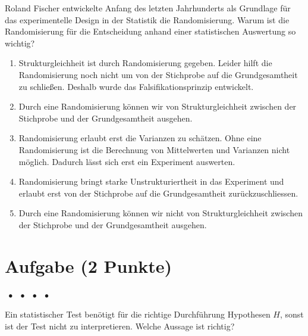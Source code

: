 \documentclass[a4paper, 9pt]{scrartcl}\usepackage[]{graphicx}\usepackage[]{xcolor}
\begin{document}
Roland Fischer entwickelte Anfang des letzten Jahrhunderts als Grundlage für das experimentelle Design in der Statistik die Randomisierung. Warum ist die Randomisierung für die Entscheidung anhand einer statistischen Auswertung so wichtig?



\begin{enumerate}
\item [\textbf{A} \msquare] Strukturgleichheit ist durch Randomisierung gegeben. Leider hilft die Randomisierung noch nicht um von der Stichprobe auf die Grundgesamtheit zu schließen. Deshalb wurde das Falsifikationsprinzip entwickelt.
\item [\textbf{B} \msquare] Durch eine Randomisierung können wir von Strukturgleichheit zwischen der Stichprobe und der Grundgesamtheit ausgehen.
\item [\textbf{C} \msquare] Randomisierung erlaubt erst die Varianzen zu schätzen. Ohne eine Randomisierung ist die Berechnung von Mittelwerten und Varianzen nicht möglich. Dadurch lässt sich erst ein Experiment auswerten.
\item [\textbf{D} \msquare] Randomisierung bringt starke Unstrukturiertheit in das Experiment und erlaubt erst von der Stichprobe auf die Grundgesamtheit zurückzuschliessen.
\item [\textbf{E} \msquare] Durch eine Randomisierung können wir nicht von Strukturgleichheit zwischen der Stichprobe und der Grundgesamtheit ausgehen.
\end{enumerate}

\section{Aufgabe \hfill (2 Punkte)}

\ifcollection
\begin{flushright}
\tiny\vspace{-2Ex}
\textbf{\examinhaltstart}
\exammodulemathstat $\;\bullet$
\exammodulestat $\;\bullet$
\exammodulestatbbv $\;\bullet$
\exammodulestatversuch $\;\bullet$
\exammodulebiostat
\vspace{-1Ex}
\end{flushright}
\fi




Ein statistischer Test benötigt für die richtige Durchführung Hypothesen $H$, sonst ist der Test nicht zu interpretieren. Welche Aussage ist richtig?
\end{document}
